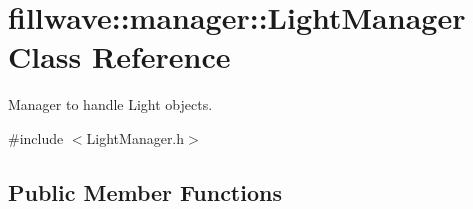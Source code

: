 \hypertarget{classfillwave_1_1manager_1_1LightManager}{}\section{fillwave\+:\+:manager\+:\+:Light\+Manager Class Reference}
\label{classfillwave_1_1manager_1_1LightManager}


Manager to handle Light objects.  




{\ttfamily \#include $<$Light\+Manager.\+h$>$}

\subsection*{Public Member Functions}
